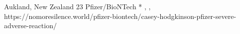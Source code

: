           {
            Aukland, New Zealand
          }
          {
            23
          }
          {
            Pfizer/BioNTech
          }
          {
            *
          }
          {
            ,
            ,
          }
          {
            https://nomoresilence.world/pfizer-biontech/casey-hodgkinson-pfizer-severe-adverse-reaction/
          }

